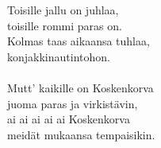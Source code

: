 
Toisille jallu on juhlaa, \\ toisille rommi paras on. \\ Kolmas taas aikaansa tuhlaa, \\ konjakkinautintohon. \\ \hspace{10mm} \\ Mutt' kaikille on Koskenkorva \\ juoma paras ja virkistävin, \\ ai ai ai ai ai Koskenkorva \\ meidät mukaansa tempaisikin.